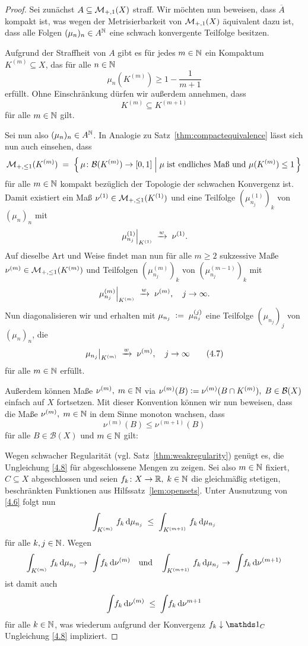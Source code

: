 \documentclass[../main/main.tex]{subfiles}
\begin{document}
	\begin{proof}
		Sei zunächst $A \subseteq \mathcal{M}_{+,1}(X)$ straff. Wir möchten nun beweisen, dass $\overline{A}$ 
		kompakt ist, was wegen der Metrisierbarkeit von $\mathcal{M}_{+,1}(X)$ äquivalent dazu ist,
		dass alle Folgen $(\mu_n)_n \in A^{\mathbb{N}}$ eine schwach konvergente Teilfolge besitzen. 
		
		Aufgrund der Straffheit von $A$ gibt es für jedes $m \in \mathbb{N}$ ein Kompaktum $K^{(m)} \subseteq X$, 
		das für alle $n \in \mathbb{N}$
		\[ \mu_n(K^{(m)}) \geq 1 - \frac{1}{m+1} \label{4.5} \tag{4.5} \]
		erfüllt. Ohne Einschränkung dürfen wir außerdem annehmen, dass 
		\[ K^{(m)} \subseteq K^{(m+1)} \label{4.6} \tag{4.6} \] 
		für alle $m \in \mathbb{N}$ gilt.
		
		Sei nun also $(\mu_n)_n \in A^{\mathbb{N}}$.
		In Analogie zu Satz~\ref{thm:compactequivalence} lässt sich nun auch einsehen, dass 
		\[ \mathcal{M}_{+,\leq 1}(K^{(m)}) \; = \; \left\{\, \mu \colon \mathcal{B}(K^{(m)}) \to [0,1] \; \middle| \; \mu \; 
			\text{ist endliches Maß und } \mu(K^{(m)}) \leq 1 \,\right\} \]
		für alle $m \in \mathbb{N}$ kompakt bezüglich der Topologie der schwachen Konvergenz ist. Damit existiert ein Maß 
		$\nu^{(1)} \in \mathcal{M}_{+,\leq 1}(K^{(1)})$ und eine Teilfolge $(\mu_{n_j}^{(1)})_k$ von $(\mu_n)_n$ mit
		\[ \left.\mu_{n_j}^{(1)}\right|_{K^{(1)}} \; \xrightarrow{w} \; \nu^{(1)} \text{.} \]
		Auf dieselbe Art und Weise findet man nun für alle $m\geq 2$ sukzessive Maße 
		$\nu^{(m)} \in \mathcal{M}_{+,\leq 1}(K^{(m)})$ und Teilfolgen $(\mu_{n_j}^{(m)})_k$ von $(\mu_{n_j}^{(m-1)})_k$ mit
		\[ \left.\mu_{n_j}^{(m)}\right|_{K^{(m)}} \; \xrightarrow{w} \; \nu^{(m)}, \quad j \to \infty \text{.} \]
		Nun diagonalisieren wir und erhalten mit $\mu_{n_j} \; \vcentcolon = \; \mu_{n_j}^{(j)}$ eine Teilfolge 
		$(\mu_{n_j})_j$ von $(\mu_n)_n$, die
		\[ \left.\mu_{n_j}\right|_{K^{(m)}} \; \xrightarrow{w} \; \nu^{(m)}, \quad j \to \infty \label{4.7} \tag{4.7} \]
		für alle $m \in \mathbb{N}$ erfüllt.
		
		Außerdem können Maße $\nu^{(m)}, \; m \in \mathbb{N}$ via 
		$\nu^{(m)}(B) \vcentcolon = \nu^{(m)}(B \cap K^{(m)}), \; B \in \mathcal{B}(X)$ einfach auf $X$ fortsetzen. 
		Mit dieser Konvention können wir nun beweisen, dass die Maße
		$\nu^{(m)}, \; m \in \mathbb{N}$ in dem Sinne monoton wachsen, dass 
		\[ \nu^{(m)}(B) \leq \nu^{(m+1)}(B) \label{4.8} \tag{4.8} \]
		für alle $B \in \mathcal{B}(X)$ und $m \in \mathbb{N}$ gilt:
		
		Wegen schwacher Regularität (vgl. Satz~\ref{thm:weakregularity}) genügt es, die Ungleichung \eqref{4.8} 
		für abgeschlossene Mengen zu zeigen. Sei also $m \in \mathbb{N}$ fixiert, $C \subseteq X$ abgeschlossen 
		und seien $f_k \colon X \to \mathbb{R}, \; k \in \mathbb{N}$ die gleichmäßig stetigen, beschränkten Funktionen aus 
		Hilfssatz~\ref{lem:opensets}. Unter Ausnutzung von \eqref{4.6} folgt nun 
		\[ \int_{K^{(m)}} \, f_k \, \mathrm{d}\mu_{n_j} \; \leq \; \int_{K^{(m+1)}} \, f_k \, \mathrm{d}\mu_{n_j} \]
		für alle $k, j \in \mathbb{N}$. Wegen 
		\[ \measureint{K^{(m)}}{f_k}{\mu_{n_j}} \to \ \measureint{}{f_k}{\nu^{(m)}} \quad \text{und} 
			\quad \measureint{K^{(m+1)}}{f_k}{\mu_{n_j}} \to \ \measureint{}{f_k}{\nu^{(m+1)}} \]
		ist damit auch 
		\[ \int_{} \, f_k \, \mathrm{d}\nu^{(m)} \; \leq \; \int_{} \, f_k \, \mathrm{d}\nu^{m+1} \]
		für alle $k \in \mathbb{N}$, was wiederum aufgrund der Konvergenz $f_k \convdown \indfct_C$ Ungleichung 
		\eqref{4.8} impliziert.
		

\end{proof}
\end{document}
